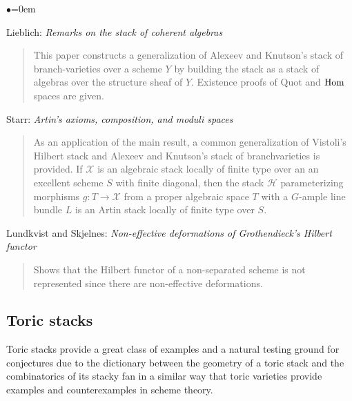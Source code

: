 \begin{list}{$\bullet$}{\leftmargin=0em}
\item Lieblich: \emph{Remarks on the stack of coherent algebras}
\cite{lieblich_remarks}
\begin{quote}
This paper constructs a generalization of Alexeev and Knutson's stack of
branch-varieties over a scheme $Y$ by building the stack as a stack of
algebras over the structure sheaf of $Y$.  Existence proofs of $\text{Quot}$
and $\mathop{\rm Hom}\nolimits$ spaces are given.
\end{quote}
\smallskip

\item Starr: \emph{Artin's axioms, composition, and moduli spaces}
\cite{starr_artin}
\begin{quote}
As an application of the main result, a common generalization of Vistoli's
Hilbert stack \cite{vistoli_hilbert} and Alexeev and Knutson's stack of
branchvarieties \cite{alexeev-knutson} is provided.  If $\mathcal{X}$ is
an algebraic stack locally of finite type over an an excellent scheme $S$
with finite diagonal, then the stack $\mathcal{H}$ parameterizing morphisms
$g: T \rightarrow \mathcal{X}$ from a proper algebraic space $T$ with a
$G$-ample line bundle $L$ is an Artin stack locally of finite type over $S$.
\end{quote}
\smallskip

\item Lundkvist and Skjelnes:
\emph{Non-effective deformations of Grothendieck's Hilbert functor}
\cite{lundkvist-skjelnes}
\begin{quote}
Shows that the Hilbert functor of a non-separated scheme is not represented
since there are non-effective deformations.
\end{quote}
\end{list}



\subsection{Toric stacks}
\label{subsection-toric}

\noindent
Toric stacks provide a great class of examples and a natural testing ground
for conjectures due to the dictionary between the geometry of a toric stack
and the combinatorics of its stacky fan in a similar way that toric varieties
provide examples and counterexamples in scheme theory.

